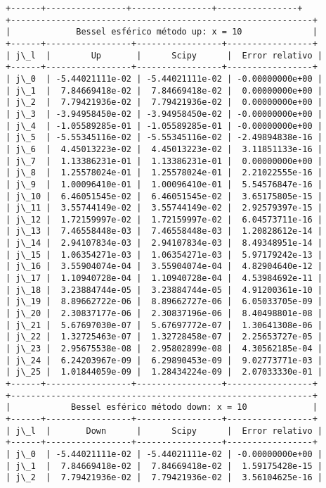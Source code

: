 \documentclass[9pt]{article}
\begin{document}
\begin{Verbatim}[commandchars=\\\{\}]
+------+----------------+----------------+----------------+
+------------------------------------------------------------+
|             Bessel esférico método up: x = 10              |
+------+-----------------+-----------------+-----------------+
| j\_l  |        Up       |      Scipy      |  Error relativo |
+------+-----------------+-----------------+-----------------+
| j\_0  | -5.44021111e-02 | -5.44021111e-02 | -0.00000000e+00 |
| j\_1  |  7.84669418e-02 |  7.84669418e-02 |  0.00000000e+00 |
| j\_2  |  7.79421936e-02 |  7.79421936e-02 |  0.00000000e+00 |
| j\_3  | -3.94958450e-02 | -3.94958450e-02 | -0.00000000e+00 |
| j\_4  | -1.05589285e-01 | -1.05589285e-01 | -0.00000000e+00 |
| j\_5  | -5.55345116e-02 | -5.55345116e-02 | -2.49894838e-16 |
| j\_6  |  4.45013223e-02 |  4.45013223e-02 |  3.11851133e-16 |
| j\_7  |  1.13386231e-01 |  1.13386231e-01 |  0.00000000e+00 |
| j\_8  |  1.25578024e-01 |  1.25578024e-01 |  2.21022555e-16 |
| j\_9  |  1.00096410e-01 |  1.00096410e-01 |  5.54576847e-16 |
| j\_10 |  6.46051545e-02 |  6.46051545e-02 |  3.65175805e-15 |
| j\_11 |  3.55744149e-02 |  3.55744149e-02 |  2.92579397e-15 |
| j\_12 |  1.72159997e-02 |  1.72159997e-02 |  6.04573711e-16 |
| j\_13 |  7.46558448e-03 |  7.46558448e-03 |  1.20828612e-14 |
| j\_14 |  2.94107834e-03 |  2.94107834e-03 |  8.49348951e-14 |
| j\_15 |  1.06354271e-03 |  1.06354271e-03 |  5.97179242e-13 |
| j\_16 |  3.55904074e-04 |  3.55904074e-04 |  4.82904640e-12 |
| j\_17 |  1.10940728e-04 |  1.10940728e-04 |  4.53984692e-11 |
| j\_18 |  3.23884744e-05 |  3.23884744e-05 |  4.91200361e-10 |
| j\_19 |  8.89662722e-06 |  8.89662727e-06 |  6.05033705e-09 |
| j\_20 |  2.30837177e-06 |  2.30837196e-06 |  8.40498801e-08 |
| j\_21 |  5.67697030e-07 |  5.67697772e-07 |  1.30641308e-06 |
| j\_22 |  1.32725463e-07 |  1.32728458e-07 |  2.25653727e-05 |
| j\_23 |  2.95675538e-08 |  2.95802899e-08 |  4.30562185e-04 |
| j\_24 |  6.24203967e-09 |  6.29890453e-09 |  9.02773771e-03 |
| j\_25 |  1.01844059e-09 |  1.28434224e-09 |  2.07033330e-01 |
+------+-----------------+-----------------+-----------------+
+------------------------------------------------------------+
|            Bessel esférico método down: x = 10             |
+------+-----------------+-----------------+-----------------+
| j\_l  |       Down      |      Scipy      |  Error relativo |
+------+-----------------+-----------------+-----------------+
| j\_0  | -5.44021111e-02 | -5.44021111e-02 | -0.00000000e+00 |
| j\_1  |  7.84669418e-02 |  7.84669418e-02 |  1.59175428e-15 |
| j\_2  |  7.79421936e-02 |  7.79421936e-02 |  3.56104625e-16 |

\end{Verbatim}
\end{document}
